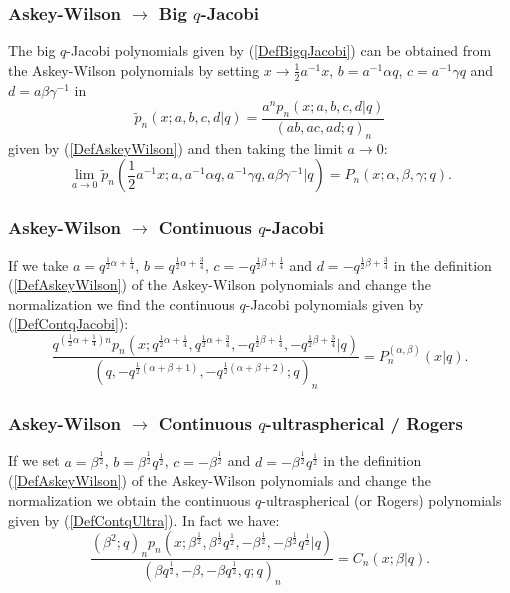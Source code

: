 \documentclass[envcountchap,graybox]{svmono}
\newcounter{rom}
\begin{document}
\subsubsection*{Askey-Wilson $\rightarrow$ Big $q$-Jacobi}
The big $q$-Jacobi polynomials given by (\ref{DefBigqJacobi}) can be obtained from the
Askey-Wilson polynomials by setting $x\rightarrow \frac{1}{2}a^{-1}x$, $b=a^{-1}\alpha q$,
$c=a^{-1}\gamma q$ and $d=a\beta \gamma^{-1}$ in
$${\tilde p}_n(x;a,b,c,d|q)=\frac{a^np_n(x;a,b,c,d|q)}{(ab,ac,ad;q)_n}$$
given by (\ref{DefAskeyWilson}) and then taking the limit $a\rightarrow 0$:
\begin{equation}
\lim_{a\rightarrow 0}{\tilde p}_n(\textstyle\frac{1}{2}a^{-1}x;a,a^{-1}\alpha q,
a^{-1}\gamma q,a\beta \gamma^{-1}|q)=P_n(x;\alpha,\beta,\gamma;q).
\end{equation}

\subsubsection*{Askey-Wilson $\rightarrow$ Continuous $q$-Jacobi}
If we take $a=q^{\frac{1}{2}\alpha+\frac{1}{4}}$, $b=q^{\frac{1}{2}\alpha+\frac{3}{4}}$,
$c=-q^{\frac{1}{2}\beta+\frac{1}{4}}$ and $d=-q^{\frac{1}{2}\beta+\frac{3}{4}}$ in
the definition (\ref{DefAskeyWilson}) of the Askey-Wilson polynomials and
change the normalization we find the continuous $q$-Jacobi polynomials given
by (\ref{DefContqJacobi}):
\begin{equation}
\frac{q^{(\frac{1}{2}\alpha+\frac{1}{4})n}p_n(x;q^{\frac{1}{2}\alpha+\frac{1}{4}},q^{\frac{1}{2}\alpha+\frac{3}{4}},
-q^{\frac{1}{2}\beta+\frac{1}{4}},-q^{\frac{1}{2}\beta+\frac{3}{4}}|q)}
{(q,-q^{\frac{1}{2}(\alpha+\beta+1)},-q^{\frac{1}{2}(\alpha+\beta+2)};q)_n}
=P_n^{(\alpha,\beta)}(x|q).
\end{equation}

\subsubsection*{Askey-Wilson $\rightarrow$ Continuous $q$-ultraspherical / Rogers}
If we set $a=\beta^{\frac{1}{2}}$, $b=\beta^{\frac{1}{2}}q^{\frac{1}{2}}$,
$c=-\beta^{\frac{1}{2}}$ and $d=-\beta^{\frac{1}{2}}q^{\frac{1}{2}}$ in the definition
(\ref{DefAskeyWilson}) of the Askey-Wilson polynomials and change the
normalization we obtain the continuous $q$-ultraspherical (or Rogers)
polynomials given by (\ref{DefContqUltra}). In fact we have:
\begin{equation}
\frac{(\beta^2;q)_np_n(x;\beta^{\frac{1}{2}},\beta^{\frac{1}{2}}q^{\frac{1}{2}},
-\beta^{\frac{1}{2}},-\beta^{\frac{1}{2}}q^{\frac{1}{2}}|q)}
{(\beta q^{\frac{1}{2}},-\beta,-\beta q^{\frac{1}{2}},q;q)_n}=C_n(x;\beta|q).
\end{equation}
\end{document}
